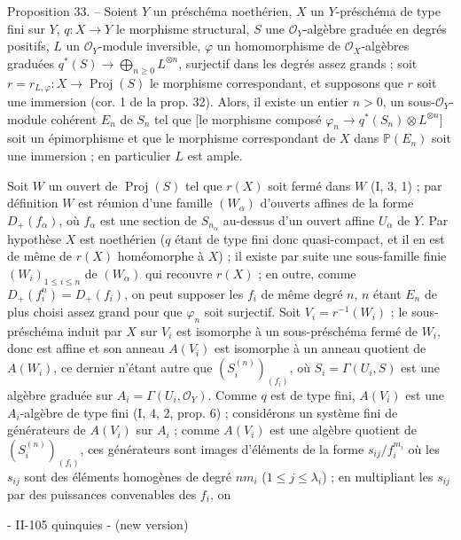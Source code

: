 Proposition 33. -- Soient $Y$ un préschéma noethérien, $X$ un $Y$-préschéma de type fini sur $Y$, $q: X \to Y$ le morphisme structural, $S$ une $\mathcal{O}_Y$-algèbre graduée en degrés positifs, $L$ un $\mathcal{O}_Y$-module inversible, $\varphi$ un homomorphisme de $\mathcal{O}_X$-algèbres graduées $q^*(S) \to \bigoplus_{n \ge 0} L^{\otimes n}$, surjectif dans les degrés assez grands ; soit $r = r_{L, \varphi}: X \to \operatorname{Proj}(S)$ le morphisme correspondant, et supposons que $r$ soit une immersion (cor. 1 de la prop. 32). Alors, il existe un entier $n > 0$, un sous-$\mathcal{O}_Y$-module cohérent $E_n$ de $S_n$ tel que [le morphisme composé $\varphi_n \to q^*(S_n) \otimes L^{\otimes n}$] soit un épimorphisme et que le morphisme correspondant de $X$ dans $\mathbb{P}(E_n)$ soit une immersion ; en particulier $L$ est ample.

Soit $W$ un ouvert de $\operatorname{Proj}(S)$ tel que $r(X)$ soit fermé dans $W$ (I, 3, 1) ; par définition $W$ est réunion d'une famille $(W_\alpha)$ d'ouverts affines de la forme $D_+(f_\alpha)$, où $f_\alpha$ est une section de $S_{n_\alpha}$ au-dessus d'un ouvert affine $U_\alpha$ de $Y$. Par hypothèse $X$ est noethérien ($q$ étant de type fini donc quasi-compact, et il en est de même de $r(X)$ homéomorphe à $X$) ; il existe par suite une sous-famille finie $(W_i)_{1 \le i \le n}$ de $(W_\alpha)$ qui recouvre $r(X)$ ; en outre, comme $D_+(f_i^n) = D_+(f_i)$, on peut supposer les $f_i$ de même degré $n$, $n$ étant $E_n$ de plus choisi assez grand pour que $\varphi_n$ soit surjectif. Soit $V_i = r^{-1}(W_i)$ ; le sous-préschéma induit par $X$ sur $V_i$ est isomorphe à un sous-préschéma fermé de $W_i$, donc est affine et son anneau $A(V_i)$ est isomorphe à un anneau quotient de $A(W_i)$, ce dernier n'étant autre que $(S_i^{(n)})_{(f_i)}$, où $S_i = \Gamma(U_i, S)$ est une algèbre graduée sur $A_i = \Gamma(U_i, \mathcal{O}_Y)$. Comme $q$ est de type fini, $A(V_i)$ est une $A_i$-algèbre de type fini (I, 4, 2, prop. 6) ; considérons un système fini de générateurs de $A(V_i)$ sur $A_i$ ; comme $A(V_i)$ est une algèbre quotient de $(S_i^{(n)})_{(f_i)}$, ces générateurs sont images d'éléments de la forme $s_{ij}/f_i^{m_i}$ où les $s_{ij}$ sont des éléments homogènes de degré $nm_i$ ($1 \le j \le \lambda_i$) ; en multipliant les $s_{ij}$ par des puissances convenables des $f_i$, on

\newpage


- II-105 quinquies - (new version)

